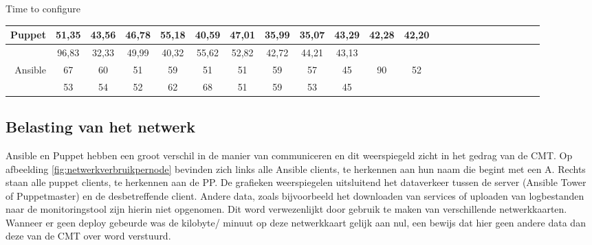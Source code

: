 Time to configure

\begin{tabular}{| r |c |c |c |c |c |c |c |c |c |c |c |c |c |c |c |c |c |c |c |c | c c |}
  \hline			
  
Puppet & 51,35 & 43,56 & 46,78 & 55,18 & 40,59 & 47,01 & 35,99 & 35,07 & 43,29 & 42,28 & 42,20 \\ \hline
            & 96,83 & 32,33 & 49,99 & 40,32 & 55,62 & 52,82 & 42,72 & 44,21 & 43,13 & &  \\ \hline
            
   
  Ansible & 67 & 60 & 51 & 59 & 51 & 51 & 59 & 57 & 45 & 90 & 52  \\ \hline
                & 53 & 54 & 52 & 62 & 68 & 51 & 59 & 53 & 45 & & \\
  \hline  
\end{tabular}

\subsection{Belasting van het netwerk}

Ansible en Puppet hebben een groot verschil in de manier van communiceren en dit weerspiegeld zicht in het gedrag van de CMT. Op afbeelding \ref{fig:netwerkverbruikpernode} bevinden zich links alle Ansible clients, te herkennen aan hun naam die begint met een A. Rechts staan alle puppet clients, te herkennen aan de PP. De grafieken weerspiegelen uitsluitend het dataverkeer tussen de server (Ansible Tower of Puppetmaster) en de desbetreffende client. Andere data, zoals bijvoorbeeld het downloaden van services of uploaden van logbestanden naar de monitoringstool zijn hierin niet opgenomen. Dit word verwezenlijkt door gebruik te maken van verschillende netwerkkaarten. Wanneer er geen deploy gebeurde was de kilobyte/ minuut op deze netwerkkaart gelijk aan nul, een bewijs dat hier geen andere data dan deze van de CMT over word verstuurd.  \newline

